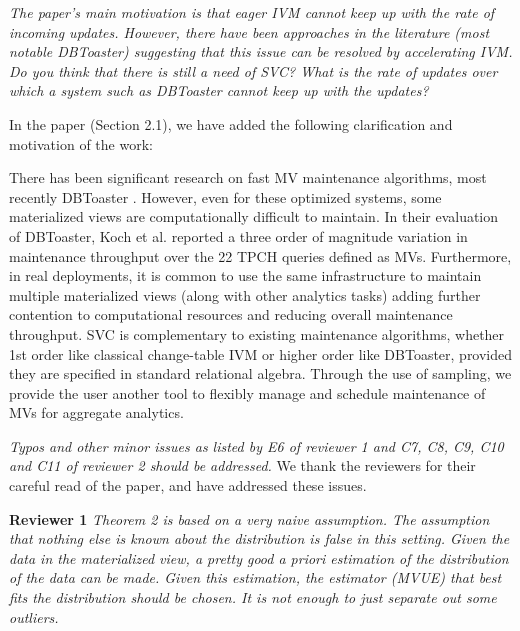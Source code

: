 \vspace{1em}
\emph{The paper's main motivation is that eager IVM cannot keep up with the rate of incoming updates. However, there have been approaches in the literature (most notable DBToaster) suggesting that this issue can be resolved by accelerating IVM. Do you think that there is still a need of SVC? What is the rate of updates over which a system such as DBToaster cannot keep up with the updates?}

In the paper (Section 2.1), we have added the following clarification and motivation of the work:
\begin{displayquote}There has been significant research on fast MV maintenance algorithms, most recently DBToaster \cite{DBLP:journals/vldb/KochAKNNLS14}. However, even for these optimized systems, some materialized views are computationally difficult to maintain. In their evaluation of DBToaster, Koch et al. \cite{DBLP:journals/vldb/KochAKNNLS14} reported a three order of magnitude variation in maintenance throughput over the 22 TPCH queries defined as MVs. Furthermore, in real deployments, it is common to use the same infrastructure to maintain multiple materialized views (along with other analytics tasks) adding further contention to computational resources and reducing overall maintenance throughput. SVC is complementary to existing maintenance algorithms, whether 1st order like classical change-table IVM or higher order like DBToaster, provided they are specified in standard relational algebra. Through the use of sampling, we provide the user another tool to flexibly manage and schedule maintenance of MVs for aggregate analytics.\end{displayquote}

\vspace{1em}
\emph{Typos and other minor issues as listed by E6 of reviewer 1 and C7, C8, C9, C10 and C11 of reviewer 2 should be addressed.}
We thank the reviewers for their careful read of the paper, and have addressed these issues.

\vspace{1em}
\noindent\textbf{Reviewer 1}
\emph{Theorem 2 is based on a very naive assumption. The assumption that nothing else is known about the distribution is false in this setting. Given the data in the materialized view, a pretty good a priori estimation of the distribution of the data can be made. Given this estimation, the estimator (MVUE) that best fits the distribution should be chosen. It is not enough to just separate out some outliers.}


